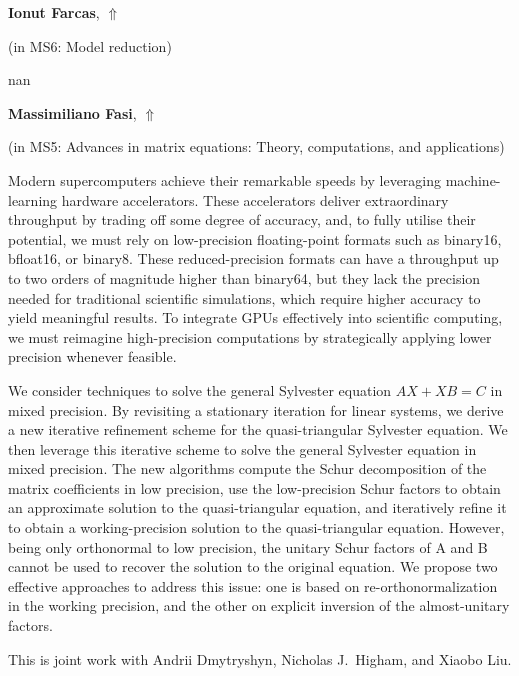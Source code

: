 \documentclass[ILAS2025-program.tex]{subfiles}
\begin{document}
     \hypertarget{down0167}{}\begin{ilasabstract}
    
    \textbf{Ionut Farcas},  \hfill \hyperlink{up0167}{$\Uparrow$}
    
    (in {\color{mstitle}MS6: Model reduction})
        
        \mtskip
    nan\end{ilasabstract}
     \hypertarget{down0066}{}\begin{ilasabstract}
    
    \textbf{Massimiliano Fasi},  \hfill \hyperlink{up0066}{$\Uparrow$}
    
    (in {\color{mstitle}MS5: Advances in matrix equations: Theory, computations, and applications})
        
        \mtskip
    Modern supercomputers achieve their remarkable speeds by leveraging machine-learning hardware accelerators.
These accelerators deliver extraordinary throughput by trading off some degree of accuracy, and, to fully utilise their potential, we must rely on low-precision floating-point formats such as binary16, bfloat16, or binary8.
These reduced-precision formats can have a throughput up to two orders of magnitude higher than binary64, but they lack the precision needed for traditional scientific simulations, which require higher accuracy to yield meaningful results.
To integrate GPUs effectively into scientific computing, we must reimagine high-precision computations by strategically applying lower precision whenever feasible.

We consider techniques to solve the general Sylvester equation $AX + XB = C$ in mixed precision.
By revisiting a stationary iteration for linear systems, we derive a new iterative refinement scheme for the quasi-triangular Sylvester equation.
We then leverage this iterative scheme to solve the general Sylvester equation in mixed precision.
The new algorithms compute the Schur decomposition of the matrix coefficients in low precision, use the low-precision Schur factors to obtain an approximate solution to the quasi-triangular equation, and iteratively refine it to obtain a working-precision solution to the quasi-triangular equation.
However, being only orthonormal to low precision, the unitary Schur factors of A and B cannot be used to recover the solution to the original equation.
We propose two effective approaches to address this issue: one is based on re-orthonormalization in the working precision, and the other on explicit inversion of the almost-unitary factors.

This is joint work with Andrii Dmytryshyn, Nicholas J.~Higham, and Xiaobo Liu.
 \end{ilasabstract}
\end{document}
